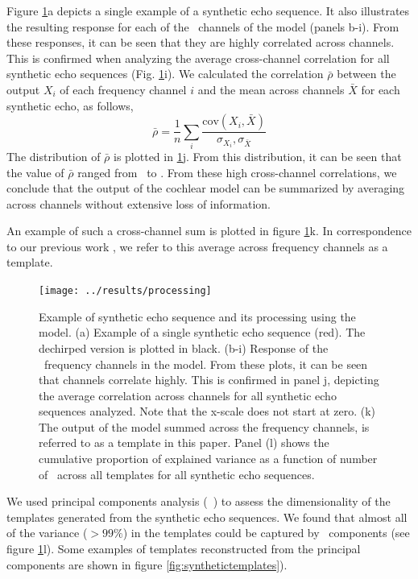 \documentclass[preprint,5p]{elsarticle}
\begin{document}
Figure \ref{fig:processing}a depicts a single example of a synthetic echo sequence. It also illustrates the resulting response for each of the \nfilters\ channels of the \citet{Wiegrebe2008} model (panels b-i). From these responses, it can be seen that they are highly correlated across channels. This is confirmed when analyzing the average cross-channel correlation for all synthetic echo sequences (Fig. \ref{fig:processing}i). We calculated the correlation $\bar{\rho}$ between the output $X_i$ of each frequency channel $i$ and the mean across channels $\bar{X}$ for each synthetic echo, as follows,
%
\begin{equation}
\bar{\rho} = \frac{1}{n} \sum_i \frac{\mbox{cov}(X_i,\bar{X})}{\sigma_{X_i}, \sigma_{\bar{X}}} 
\end{equation}
%
The distribution of $\bar{\rho}$ is plotted in \ref{fig:processing}j. From this distribution, it can be seen that the value of $\bar{\rho}$ ranged from \CorrelationLow\ to \CorrelationHigh. From these high cross-channel correlations, we conclude that the output of the cochlear model can be summarized by averaging across channels without extensive loss of information. 

An example of such a cross-channel sum is plotted in figure \ref{fig:processing}k. In correspondence to our previous work \citep{Vanderelst2016}, we refer to this average across frequency channels as a template.

\begin{figure}[tb]
	\centering
	\texttt{[image: ../results/processing]}
	\caption{Example of synthetic echo sequence and its processing using the \citet{Wiegrebe2008} model. (a) Example of a single synthetic echo sequence (red). The dechirped version is plotted in black. (b-i) Response of the \nfilters\ frequency channels in the \citet{Wiegrebe2008} model. From these plots, it can be seen that channels correlate highly. This is confirmed in panel j, depicting the average correlation across channels for all synthetic echo sequences analyzed. Note that the x-scale does not start at zero. (k) The output of the \citet{Wiegrebe2008} model summed across the frequency channels, is referred to as a template in this paper. Panel (l) shows the cumulative proportion of explained variance as a function of number of \pc\ across all templates for all synthetic echo sequences.}
	\label{fig:processing}
\end{figure}


We used principal components analysis (\PCA\ ) to assess the dimensionality of the templates generated from the synthetic echo sequences. We found that almost all of the variance ($> 99\%$) in the templates could be captured by \pca\ components (see figure \ref{fig:processing}l). Some examples of templates reconstructed from the principal components are shown in figure \ref{fig:synthetictemplates}).
\end{document}
